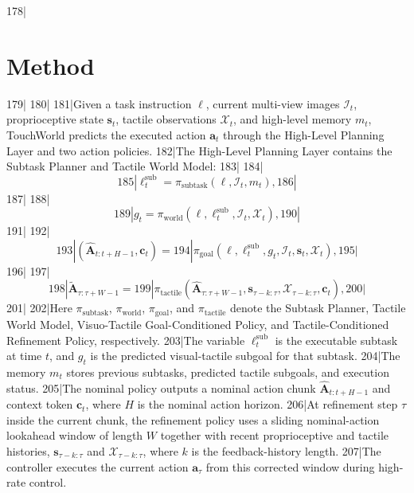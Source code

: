 178|\section{Method}
179|\label{sec:method}
180|
181|Given a task instruction $\ell$, current multi-view images $\mathcal{I}_t$, proprioceptive state $\mathbf{s}_t$, tactile observations $\mathcal{X}_t$, and high-level memory $m_t$, TouchWorld predicts the executed action $\mathbf{a}_t$ through the High-Level Planning Layer and two action policies.
182|The High-Level Planning Layer contains the Subtask Planner and Tactile World Model:
183|
184|\begin{equation}
185|    \ell_t^{\mathrm{sub}} = \pi_{\mathrm{subtask}}(\ell, \mathcal{I}_t, m_t),
186|\end{equation}
187|
188|\begin{equation}
189|    g_t = \pi_{\mathrm{world}}(\ell, \ell_t^{\mathrm{sub}}, \mathcal{I}_t, \mathcal{X}_t),
190|\end{equation}
191|
192|\begin{equation}
193|    \left(\hat{\mathbf{A}}_{t:t+H-1}, \mathbf{c}_t\right) =
194|    \pi_{\mathrm{goal}}(\ell, \ell_t^{\mathrm{sub}}, g_t, \mathcal{I}_t, \mathbf{s}_t, \mathcal{X}_t),
195|\end{equation}
196|
197|\begin{equation}
198|    \tilde{\mathbf{A}}_{\tau:\tau+W-1} =
199|    \pi_{\mathrm{tactile}}(\hat{\mathbf{A}}_{\tau:\tau+W-1}, \mathbf{s}_{\tau-k:\tau}, \mathcal{X}_{\tau-k:\tau}, \mathbf{c}_t),
200|\end{equation}
201|
202|Here $\pi_{\mathrm{subtask}}$, $\pi_{\mathrm{world}}$, $\pi_{\mathrm{goal}}$, and $\pi_{\mathrm{tactile}}$ denote the Subtask Planner, Tactile World Model, Visuo-Tactile Goal-Conditioned Policy, and Tactile-Conditioned Refinement Policy, respectively.
203|The variable $\ell_t^{\mathrm{sub}}$ is the executable subtask at time $t$, and $g_t$ is the predicted visual-tactile subgoal for that subtask.
204|The memory $m_t$ stores previous subtasks, predicted tactile subgoals, and execution status.
205|The nominal policy outputs a nominal action chunk $\hat{\mathbf{A}}_{t:t+H-1}$ and context token $\mathbf{c}_t$, where $H$ is the nominal action horizon.
206|At refinement step $\tau$ inside the current chunk, the refinement policy uses a sliding nominal-action lookahead window of length $W$ together with recent proprioceptive and tactile histories, $\mathbf{s}_{\tau-k:\tau}$ and $\mathcal{X}_{\tau-k:\tau}$, where $k$ is the feedback-history length.
207|The controller executes the current action $\mathbf{a}_\tau$ from this corrected window during high-rate control.
